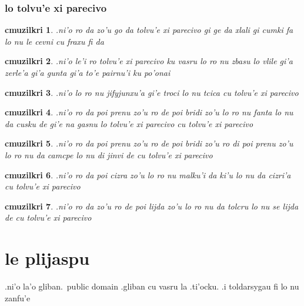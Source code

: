 \documentclass{report}
\newtheorem{cmuzilkri}{cmuzilkri}
\begin{document}
\subsection{lo tolvu'e xi parecivo}
\begin{cmuzilkri}
	.ni'o ro da zo'u go da tolvu'e xi parecivo gi ge da xlali gi cumki fa lo nu le cevni cu fraxu fi da
\end{cmuzilkri}
\begin{cmuzilkri}
	.ni'o le'i ro tolvu'e xi parecivo ku vasru lo ro nu zbasu lo vlile gi'a zerle'a gi'a gunta gi'a to'e pairnu'i ku po'onai
\end{cmuzilkri}
\begin{cmuzilkri}
	.ni'o lo ro nu jifyjunxu'a gi'e troci lo nu tcica cu tolvu'e xi parecivo
\end{cmuzilkri}
\begin{cmuzilkri}
	.ni'o ro da poi prenu zo'u ro de poi bridi zo'u lo ro nu fanta lo nu da cusku de gi'e na gasnu lo tolvu'e xi parecivo cu tolvu'e xi parecivo
\end{cmuzilkri}
\begin{cmuzilkri}
	.ni'o ro da poi prenu zo'u ro de poi bridi zo'u ro di poi prenu zo'u lo ro nu da camcpe lo nu di jinvi de cu tolvu'e xi parecivo
\end{cmuzilkri}
\begin{cmuzilkri}
	.ni'o ro da poi cizra zo'u lo ro nu malku'i da ki'u lo nu da cizri'a cu tolvu'e xi parecivo
\end{cmuzilkri}
\begin{cmuzilkri}
	.ni'o ro da zo'u ro de poi lijda zo'u lo ro nu da tolcru lo nu se lijda de cu tolvu'e xi parecivo
\end{cmuzilkri}

\chapter{le plijaspu}
.ni'o la'o gliban.\ public domain .gliban cu vasru la .ti'ocku.  .i toldarsygau fi lo nu zanfu'e
\end{document}
